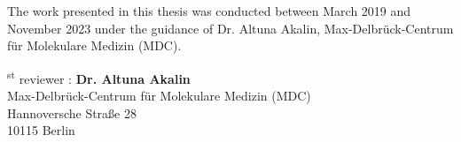 
\begin{supervisorpage}




\vspace{100pt} %
\noindent

The work presented in this thesis was conducted between March 2019 and November 2023 under the guidance of Dr. Altuna Akalin, Max-Delbrück-Centrum für Molekulare Medizin (MDC).\\

\vspace{10pt} %

\textsuperscript{st} reviewer : \textbf{Dr. Altuna Akalin}\\
\hspace*{5.3em} Max-Delbrück-Centrum für Molekulare Medizin (MDC)\\
\hspace*{5.3em} Hannoversche Straße 28\\
\hspace*{5.3em} 10115 Berlin


\end{supervisorpage}

